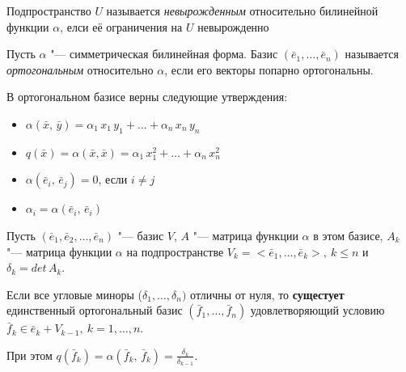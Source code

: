 \begin{definition}
  Подпространство $U$ называется \textit{невырожденным} относительно билинейной функции $\alpha$, елси её ограничения на $U$ невырожденно
\end{definition}

\begin{definition}
  Пусть $\alpha$ "--- симметрическая билинейная форма. Базис $(\bar{e}_1, \ldots, \bar{e}_n)$ называется \textit{ортогональным} относительно $\alpha$, если его векторы попарно ортогональны.

\end{definition}
В ортогональном базисе верны следующие утверждения:
\begin{itemize}
  \item[] $\alpha(\bar{x}, \, \bar{y}) = \alpha_1 \, x_1 \, y_1 + \ldots + \alpha_n \, x_n \, y_n$
  \item[] $q(\bar{x}) = \alpha(\bar{x}, \bar{x}) = \alpha_1 \, x_1^2 + \ldots + \alpha_n \, x_n^2$
  \item[] $\alpha(\bar{e}_i, \, \bar{e}_j) = 0$, если $i \neq j$
  \item[] $\alpha_i = \alpha(\bar{e}_i, \, \bar{e}_i)$
\end{itemize}

\begin{theorem}
  \label{theorem: gram_schmidt}
  Пусть $(\bar{e}_1, \bar{e}_2, \ldots, \bar{e}_n)$ "--- базис $V$, $A$ "--- матрица функции $\alpha$ в этом базисе, $A_k$ "--- матрица функции $\alpha$ на подпространстве $V_k = <\!\bar{e}_1, \ldots, \bar{e}_k \!>, ~ k \leq n$ и $\delta_k = det\,A_k$.

  Если все угловые миноры ($\delta_1, \ldots, \delta_n)$ отличны от нуля, то \textbf{сущестует} единственный ортогональный базис $(\bar{f}_1, \ldots, \bar{f}_n)$ удовлетворяющий условию $\bar{f}_k \in \bar{e}_k + V_{k - 1},~ k = 1, \ldots, n$.

  При этом $q(\bar{f}_k) = \alpha(\bar{f}_k, \, \bar{f}_k) = \frac{\delta_k}{\delta_{k - 1}}$.
\end{theorem}

